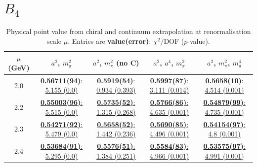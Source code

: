 \documentclass[12pt]{extarticle}
\begin{document}
\section{$B_4$}
\begin{table}[h!]
\begin{center}
\begin{tabular}{|c|c|c|c|c|}
\hline
$\mu$ (GeV) & $a^2$, $m_\pi^2$& $a^2$, $m_\pi^2$ (no C)& $a^2$, $a^4$, $m_\pi^2$& $a^2$, $m_\pi^2$, $m_\pi^4$\\
\hline
2.0& \hyperlink{SSpPP/NPR/a2m2_20.pdf.1}{\textbf{0.56711(94)}: 5.155 (0.0)} & \hyperlink{SSpPP/NPR/a2m2noC_20.pdf.1}{\textbf{0.5919(54)}: 0.934 (0.393)} & \hyperlink{SSpPP/NPR/a2a4m2_20.pdf.1}{\textbf{0.5997(87)}: 3.111 (0.014)} & \hyperlink{SSpPP/NPR/a2m2m4_20.pdf.1}{\textbf{0.5658(10)}: 4.514 (0.001)}\\
2.2& \hyperlink{SSpPP/NPR/a2m2_22.pdf.1}{\textbf{0.55003(96)}: 5.515 (0.0)} & \hyperlink{SSpPP/NPR/a2m2noC_22.pdf.1}{\textbf{0.5735(52)}: 1.315 (0.268)} & \hyperlink{SSpPP/NPR/a2a4m2_22.pdf.1}{\textbf{0.5766(86)}: 4.635 (0.001)} & \hyperlink{SSpPP/NPR/a2m2m4_22.pdf.1}{\textbf{0.54879(99)}: 4.735 (0.001)}\\
2.3& \hyperlink{SSpPP/NPR/a2m2_23.pdf.1}{\textbf{0.54271(92)}: 5.479 (0.0)} & \hyperlink{SSpPP/NPR/a2m2noC_23.pdf.1}{\textbf{0.5658(52)}: 1.442 (0.236)} & \hyperlink{SSpPP/NPR/a2a4m2_23.pdf.1}{\textbf{0.5690(85)}: 4.496 (0.001)} & \hyperlink{SSpPP/NPR/a2m2m4_23.pdf.1}{\textbf{0.54154(97)}: 4.8 (0.001)}\\
2.4& \hyperlink{SSpPP/NPR/a2m2_24.pdf.1}{\textbf{0.53684(91)}: 5.295 (0.0)} & \hyperlink{SSpPP/NPR/a2m2noC_24.pdf.1}{\textbf{0.5576(51)}: 1.384 (0.251)} & \hyperlink{SSpPP/NPR/a2a4m2_24.pdf.1}{\textbf{0.5584(83)}: 4.966 (0.001)} & \hyperlink{SSpPP/NPR/a2m2m4_24.pdf.1}{\textbf{0.53575(97)}: 4.991 (0.001)}\\
\hline
\end{tabular}
\caption{Physical point value from chiral and continuum extrapolation at renormalisation scale $\mu$. Entries are \textbf{value(error)}: $\chi^2/\text{DOF}$ ($p$-value).}
\end{center}
\end{table}
\end{document}
